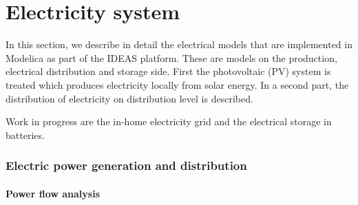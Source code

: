 
\chapter{Electricity system}



In this section, we describe in detail the electrical models that are implemented in Modelica as part of the IDEAS platform. These are models on the production, electrical distribution and storage side. First the photovoltaic (PV) system is treated which produces electricity locally from solar energy. In a second part, the distribution of electricity on distribution level is described.

Work in progress are the in-home electricity grid and the electrical storage in batteries.

\subsection{Electric power generation and distribution}

\subsubsection{Power flow analysis}


